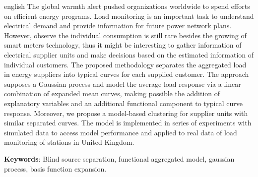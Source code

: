 \begin{resumo}[Abstract]
 \begin{otherlanguage*}{english}
    The global warmth alert pushed organizations worldwide to spend efforts on efficient energy programs. Load monitoring is an important task to understand electrical demand and provide information for future power network plans. However, observe the individual consumption is still rare besides the growing of smart meters technology, thus it might be interesting to gather information of electrical supplier units and make decisions based on the estimated information of individual customers. The proposed methodology separates the aggregated load in energy suppliers  into typical curves for each supplied customer. The approach supposes a Gaussian process and model the average load response via a linear combination of expanded mean curves, making possible the addition of explanatory variables and an additional functional component to typical curve response. Moreover, we propose a model-based clustering for supplier units with similar separated curves. The model is implemented in  series of experiments with simulated data to access model performance and applied to real data of load monitoring of stations in United Kingdom.

    \textbf{Keywords}: Blind source separation, functional aggregated model, gaussian process, basis function expansion.
 \end{otherlanguage*}
\end{resumo}
